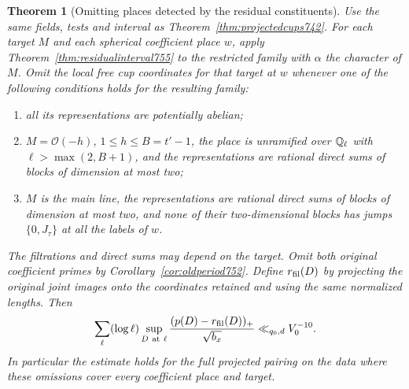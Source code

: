 \documentclass[a4paper,11pt]{article}
\newtheorem{theorem}[proposition]{Theorem}
\theoremstyle{definition}
\theoremstyle{remark}
\numberwithin{equation}{section}
\begin{document}
\begin{theorem}[Omitting places detected by the residual constituents]
\leavevmode\label{thm:filteredperiod755}
Use the same fields, tests and interval as
Theorem~\ref{thm:projectedcups742}. For each target \(M\) and
each spherical coefficient place \(w\), apply
Theorem~\ref{thm:residualinterval755} to the restricted family
with \(\alpha\) the character of \(M\). Omit the local free cup
coordinates for that target at \(w\) whenever one of the
following conditions holds for the resulting family:
\begin{enumerate}
\item all its representations are potentially abelian;
\item \(M=\mathcal O(-h)\), \(1\le h\le B=t'-1\), the place
is unramified over \(\mathbb Q_\ell\) with \(\ell>\max(2,B+1)\),
and the representations are rational direct sums of blocks
of dimension at most two;
\item \(M\) is the main line, the representations are rational
direct sums of blocks of dimension at most two, and none of
their two-dimensional blocks has jumps \(\{0,J_\tau\}\) at
all the labels of \(w\).
\end{enumerate}
The filtrations and direct sums may depend on the target.
Omit both original coefficient primes by
Corollary~\ref{cor:oldperiod752}. Define \(r_{\rm fil}(D)\)
by projecting the original joint images onto the coordinates
retained and using the same normalized lengths. Then
\[
 \sum_\ell(\log\ell)\sup_{D\ {\rm at}\ \ell}
      \frac{(p(D)-r_{\rm fil}(D))_+}{\sqrt{b_x}}
                         \ll_{q_0,d}V_0^{-10}.
\]
In particular the estimate holds for the full projected
pairing on the data where these omissions cover every
coefficient place and target.
\end{theorem}
\end{document}
